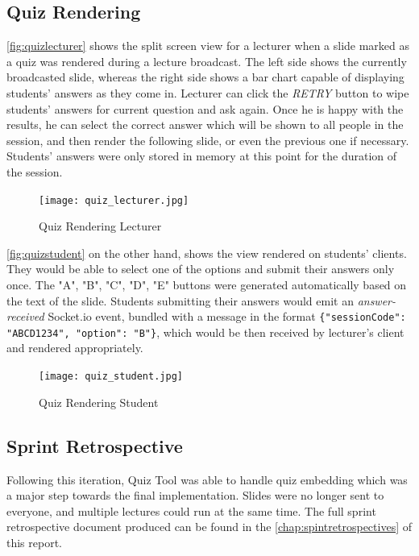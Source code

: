 \subsection{Quiz Rendering}
\autoref{fig:quizlecturer} shows the split screen view for a lecturer when a slide marked as a quiz was rendered
during a lecture broadcast. The left side shows the currently broadcasted slide, whereas the right
side shows a bar chart capable of displaying students' answers as they come in. Lecturer can
click the \textit{RETRY} button to wipe students' answers for current question and
ask again. Once he is happy with the results, he can select the correct answer which will
be shown to all people in the session, and then render the following slide, or even
the previous one if necessary. Students' answers were only stored in memory at this point
for the duration of the session.

\begin{figure}[h!]
    \centering
    \texttt{[image: quiz\_lecturer.jpg]}
    \caption{Quiz Rendering Lecturer}
    \label{fig:quizlecturer}
\end{figure}

\autoref{fig:quizstudent} on the other hand, shows the view rendered on students'
clients. They would be able to select one of the options and submit their answers
only once. The "A", "B", "C", "D", "E" buttons were generated automatically based
on the text of the slide. Students submitting their answers would emit an \textit{answer-received}
Socket.io event, bundled with a message in the format \texttt{\{"sessionCode": "ABCD1234", "option": "B"\}},
which would be then received by lecturer's client and rendered appropriately.

\begin{figure}[h!]
    \centering
    \texttt{[image: quiz\_student.jpg]}
    \caption{Quiz Rendering Student}
    \label{fig:quizstudent}
\end{figure}

\subsection{Sprint Retrospective}
Following this iteration, Quiz Tool was able to handle quiz embedding which was a major
step towards the final implementation. Slides were no longer sent to everyone,
and multiple lectures could run at the same time.
The full sprint retrospective document produced can be found in the
\autoref{chap:spintretrospectives} of this report.

